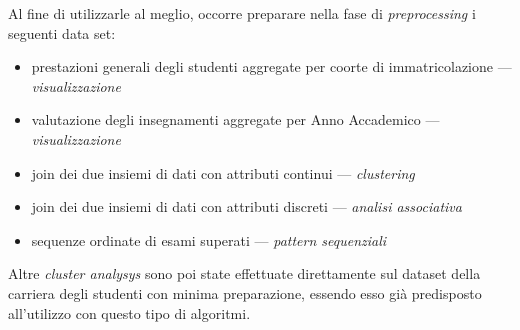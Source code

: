         Al fine di utilizzarle al meglio, occorre preparare nella fase di \textit{preprocessing} i seguenti data set:

        \begin{itemize}
            \item prestazioni generali degli studenti aggregate per coorte di immatricolazione --- \textit{visualizzazione}
            \item valutazione degli insegnamenti aggregate per Anno Accademico --- \textit{visualizzazione}
            \item join dei due insiemi di dati con attributi continui --- \textit{clustering}
            \item join dei due insiemi di dati con attributi discreti --- \textit{analisi associativa}
            \item sequenze ordinate di esami superati --- \textit{pattern sequenziali}
        \end{itemize}

        Altre \textit{cluster analysys} sono poi state effettuate direttamente sul dataset della carriera degli studenti con minima preparazione, essendo esso già predisposto all'utilizzo con questo tipo di algoritmi.
